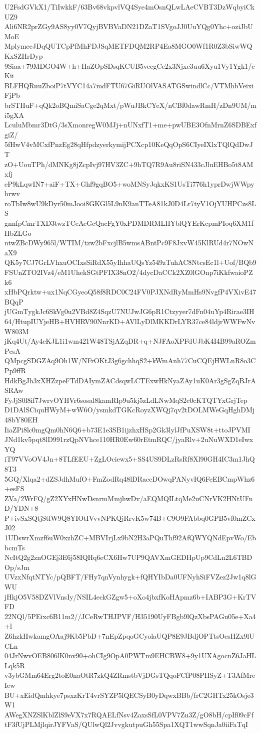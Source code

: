 U2FsdGVkX1/TiIwkkF/63Bv68vkpvlVQ4Sye4mOsnQLwLAeCVBT3DzWqbyiCkUZ9
Ali6NR2prZGy9AS8yy0V7QyjBVBVaDN21DZaT1SVgoJJ0UuYQg0Yhc+oziJbUMoE
MplymeeJDqQUTCpPfMhFDJSqMETFDQM2RP4Ea8MGO0Wf1R0Z3bSiwWQKxSZHrDyp
9Siaa+79MDGO4W+h+HaZOpSDsqKCUB5veegCe2x3Njxe3uu6Xyu1Vy1Ygk1/cKii
BLFHQRuuZboiP7tVYC14a7mdFTU67GiRUOlVASATGSwindlCc/VTMhbVeixiFjPb
brSTHuF+qQk2oBQmiSaCge2qMxt/pWuJBkCYeX/nCBf0dawRmH/zDn9UM/mi5gXA
LculuMbmr3DtG/3sXmonregW0MJj+nUNxfT1+me+pwUBE3OfnMrnZ6SDBExfgiZ/
5fHwV4vMCxfPnzEg28qHfpdzyerkymijPCXcp10KeQqOpS6CIyeIXlxTQlQdDwJT
zO+UouTPh/dMNKg8jZcpIvj97HV3ZC+9hTQ7R9Au8riSN433cJluEHBo5t8AMxfj
eP9kLqwIN7+aiF+TX+Ghf9gqBO5+woMNSyJqkxKS1UsTi776h1yprDwjWWpyhrwv
roTbIw8wU9kDyr50mJooi8GKGl5L9nK9anTTeA81kJ0D4Lr7tyV1OjYUHPCzs8LS
gnnfpCmrTXD3twzTCeAeGcQacFgY0xPDMDRMLHYblQYErKcpmPIoq6XM1fHbZLGo
ntwZBcDWy965l/WTIM/tzw2bFxcjlB5wmsABntPc9F8JxvW45KlRUd4r7NOwNaX9
QK5y7CJ7GrLVhxuOCIxsSiRdX55yIhhaUQsYz549zTuhAC8NtcsEc1l+Uof/BQb9
FSUnZTO2IVz4/eM1UhekSGtPFIX38nO2/4dycDaCCk2XZ0lGOnp7iKkfwaioPZk6
xHbPQrktw+ux1NqCGyeoQ58f8RDC0C24FV0PJXNdRyMmHs9NvgfP4VXivE47BQqP
jUGmTygkJc6SkVg0u2VBd8Z4SqzU7NUJwJG6pR1Ctzyyer7dFn04uYp4Rirae3IH
64/HtupIUYjeHB+HVHRV90NnrKD+AVlLyDlMKKDrLYR37ce84ldjrWWFwNvW803M
jKq4Ut/Ay4eKJL1i1wm421W48TSjAZqDR+q+NJFAoXPFdUJbK4I4B99aROZmPcsA
QMpcgSDGZAq9Oh1W/NFrOKtJ3g6gchhqS2+kWmAnh77CuCQEjHWLnR8o3CPp9ffR
HdkBgJh3xXHZzpeFTdDAIymZACdsqwLCTExwHkNyaZAy1uK0Ar3gSgZqBJrASRAw
FyJjS0l8if7JwrvOYHVr6sosal8kamRIp9u5kj5zLdLNwMqS2c0cKTQTYxGrjTep
D1DAlSCiquHWyM+wW6O/ysmkdTGKcRoyzXWQj7qv2tDOLMWeGqHghDMj48bY80EH
IiaZPi8lc0mgQm0hN6Q6+b73E1e3SB1ijzhxHSp2Gk3lylJfPuXSW8t+ttoJPVMI
JNd1kv5pqt8lD991rzQpNVhce110HR0Ew60rEtmRQC/jyaRlv+2uNuWXD1eIwxYQ
iT97VVoOV4Jn+8TLfEEU+ZgLOciewx5+SS4US9DLzRsRf8Xl90GH4IC3m1JhQ8T3
5GQ/Xlqa2+dZSJdhMufO+FmZodRq48lDRaccDOwqPANyvIQ6FeEBCmpWhz6+esFS
ZVa/2WrFQ/gZ2XYxHNwDsnrmMmjhwDv/aEQMQILtqMe2uCNrVK2HNtUFnD/YDN+8
P+ivSxSQtjStlW9Q8YIOtIVvvNPKQjRrvK5w74B+C9O9FAbbq0GPB5vf0mZCxJ02
1UDswrXmzf6uW0xzhZC+MBVIrjLx9bN2H3aPQuThf92AfQWYQNdEpvWo/EbbcmTs
NcItQ2g2znOGEj3E6j58IQHq6eCX6Hw7UP9QAVXmGEDHpUp9CdLn2L6TBDOp/sJm
UVzxNfqtNTYc/pQBFT/FHy7qnVynhygk+fQHYIbDa0UFNyhSiFVZez2Jw1q8lGWU
jHkjO5V58DZVlVnsIy/NSIL4eckGZgw5+oXo4jbxfKoHApmz6b+IABP3G+KrTVFD
22NQl/5PEixc6B11m2//JCeRwTHJPVF/H35190UyFBgb9lQzXbsPAGu05e+Xa4+l
Z6hzkHwkamgOAaj9Kb5PbD+7nEpZpqoGCyolaUQP8E9JBdjOPTtsOcsHZx9lUCLn
04JrNwvOEB806lK0nv90+ohCIg9OpA0PWTm9EHCBW8+9y1UXAgocnZ6JaHLLqk5R
v3ybGMm64Erg2toE0naOtR7zkQ4ZRmstbVjDGsTQqoFCfP08PHSyZ+T3AfMreIew
BU+xEidQmhkye7psxzKrT4vrSYZP5lQECSyB0yDqwxBBb/frC2GHTx25kOsje3W1
AWegXNZSlKblZlS9eVX7x7RQAELfNsv4ZaxsSfL0VPV7Zu3Z/gO8bH/cpIf09cFf
tF3fUjPLMjlqirJYFVaS/QUlwQl2JvvgkutpuGh55Spa1XQT1wwSqnJa0iiFaTqI
